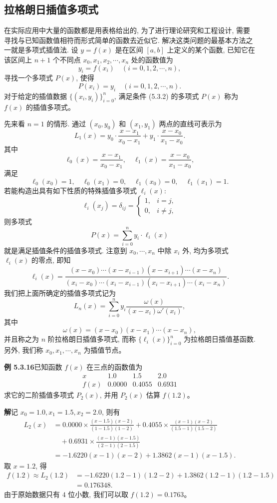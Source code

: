 \documentclass[UTF8, 12pt, fontset=fandol, oneside]{ctexart}
\begin{document}
\subsection{拉格朗日插值多项式}

在实际应用中大量的函数都是用表格给出的, 为了进行理论研究和工程设计, 需要寻找与已知函数值相符而形式简单的函数去近似它. 解决这类问题的最基本方法之一就是多项式插值法. 设 $y=f(x)$ 是在区间 $[a,b]$ 上定义的某个函数, 已知它在该区间上 $n+1$ 个不同点 $x_0,x_1,x_2,\cdots,x_n$ 处的函数值为
\[
  y_i=f(x_i)\quad (i=0,1,2,\cdots,n),
\]
寻找一个多项式 $P(x)$, 使得
\[
  P(x_i)=y_i\quad (i=0,1,2,\cdots,n).
  \tag{5.3.2}
\]
对于给定的插值数据 $\{(x_i,y_i)\}_{i=0}^n$, 满足条件 (5.3.2) 的多项式 $P(x)$ 称为 $f(x)$ 的插值多项式。

先来看 $n=1$ 的情形. 通过 $(x_0,y_0)$ 和 $(x_1,y_1)$ 两点的直线可表示为
\[
  L_1(x)=y_0\cdot\frac{x-x_1}{x_0-x_1}+y_1\cdot\frac{x-x_0}{x_1-x_0}.
\]
其中
\[
  \ell_0(x)=\frac{x-x_1}{x_0-x_1},\quad
  \ell_1(x)=\frac{x-x_0}{x_1-x_0},
\]
满足
\[
  \ell_0(x_0)=1,\quad \ell_0(x_1)=0,\quad \ell_1(x_0)=0,\quad \ell_1(x_1)=1.
\]
若能构造出具有如下性质的特殊插值多项式 $\ell_i(x)$:
\[
  \ell_i(x_j)=\delta_{ij}=
  \begin{cases}
    1, & i=j,\\
    0, & i\ne j,
  \end{cases}
\]
则多项式
\[
  P(x)=\sum_{i=0}^n y_i\cdot\ell_i(x)
\]
就是满足插值条件的插值多项式. 注意到 $x_0,\cdots,x_n$ 中除 $x_i$ 外, 均为多项式 $\ell_i(x)$ 的零点, 即知
\[
  \ell_i(x)
  =
  \frac{(x-x_0)\cdots(x-x_{i-1})(x-x_{i+1})\cdots(x-x_n)}
       {(x_i-x_0)\cdots(x_i-x_{i-1})(x_i-x_{i+1})\cdots(x_i-x_n)}.
\]
我们把上面所确定的插值多项式记为
\[
  L_n(x)=\sum_{i=0}^n y_i\frac{\omega(x)}{(x-x_i)\omega'(x_i)},
\]
其中
\[
  \omega(x)=(x-x_0)(x-x_1)\cdots(x-x_n),
  \tag{5.3.3}
\]
并且称之为 $n$ 阶拉格朗日插值多项式, 而称 $\{\ell_i(x)\}_{i=0}^n$ 为拉格朗日插值基函数. 另外, 我们称 $x_0,x_1,\cdots,x_n$ 为插值节点。

\noindent\textbf{例 5.3.16}\quad 已知函数 $f(x)$ 在三点的函数值为
\[
\begin{array}{c|ccc}
  x & 1.0 & 1.5 & 2.0\\
  \hline
  f(x) & 0.0000 & 0.4055 & 0.6931
\end{array}
\]
求它的二阶插值多项式 $P_2(x)$, 并用 $P_2(x)$ 估算 $f(1.2)$。

\noindent\textbf{解}\quad 记 $x_0=1.0,x_1=1.5,x_2=2.0$, 则有
\[
\begin{aligned}
  L_2(x)
  &=
  0.0000\times\frac{(x-1.5)(x-2)}{(1-1.5)(1-2)}
  +0.4055\times\frac{(x-1)(x-2)}{(1.5-1)(1.5-2)} \\
  &\quad
  +0.6931\times\frac{(x-1)(x-1.5)}{(2-1)(2-1.5)} \\
  &=
  -1.6220(x-1)(x-2)+1.3862(x-1)(x-1.5).
\end{aligned}
\]
取 $x=1.2$, 得
\[
\begin{aligned}
  f(1.2)\approx L_2(1.2)
  &=
  -1.6220(1.2-1)(1.2-2)
  +1.3862(1.2-1)(1.2-1.5) \\
  &=
  0.176348.
\end{aligned}
\]
由于原始数据只有 $4$ 位小数, 我们可以取 $f(1.2)=0.1763$。
\end{document}
